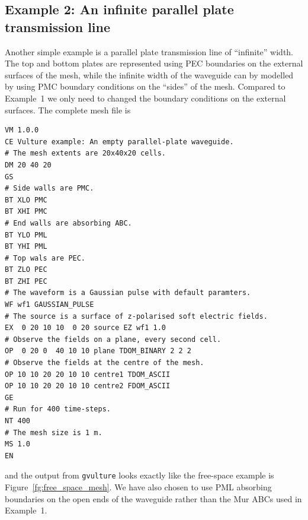\documentclass[onecolumn,a4paper]{article}
\numberwithin{equation}{section}
\begin{document}
\subsection{Example 2: An infinite parallel plate transmission line}

Another simple example is a parallel plate transmission line 
of ``infinite'' width. The top and bottom plates are represented using
PEC boundaries on the external surfaces of the mesh, while the infinite width of the
waveguide can by modelled by using PMC boundary conditions on 
the ``sides'' of the mesh. Compared to Example~1 we only need to changed the 
boundary conditions on the external surfaces. The complete mesh file is 
\begin{verbatim}
VM 1.0.0
CE Vulture example: An empty parallel-plate waveguide.
# The mesh extents are 20x40x20 cells.
DM 20 40 20
GS
# Side walls are PMC.
BT XLO PMC
BT XHI PMC
# End walls are absorbing ABC.
BT YLO PML
BT YHI PML
# Top wals are PEC.
BT ZLO PEC
BT ZHI PEC
# The waveform is a Gaussian pulse with default paramters.
WF wf1 GAUSSIAN_PULSE
# The source is a surface of z-polarised soft electric fields.
EX  0 20 10 10  0 20 source EZ wf1 1.0
# Observe the fields on a plane, every second cell.
OP  0 20 0  40 10 10 plane TDOM_BINARY 2 2 2
# Observe the fields at the centre of the mesh.
OP 10 10 20 20 10 10 centre1 TDOM_ASCII
OP 10 10 20 20 10 10 centre2 FDOM_ASCII
GE
# Run for 400 time-steps.
NT 400 
# The mesh size is 1 m.
MS 1.0
EN
\end{verbatim}
and the output from \texttt{gvulture} looks exactly like the free-space example is 
Figure~\ref{fg:free_space_mesh}. We have also chosen to use PML absorbing 
boundaries on the open ends of the waveguide rather than the Mur ABCs used in Example~1.
\end{document}
